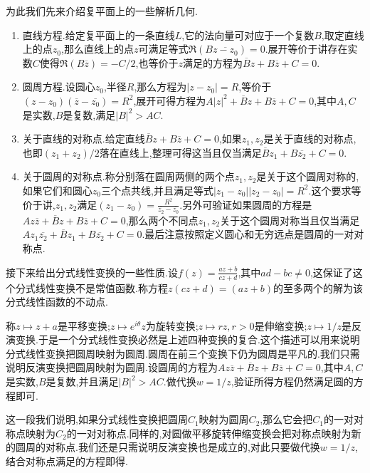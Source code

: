 为此我们先来介绍复平面上的一些解析几何.
\begin{enumerate}
	\item 直线方程.给定复平面上的一条直线$L$,它的法向量可对应于一个复数$B$,取定直线上的点$z_0$,那么直线上的点$z$可满足等式$\Re(B\overline{z-z_0})=0$.展开等价于讲存在实数$C$使得$\Re(B\overline{z})=-C/2$,也等价于$z$满足的方程为$\overline{B}z+B\overline{z}+C=0$.
	\item 圆周方程.设圆心$z_0$,半径$R$,那么方程为$|z-z_0|=R$,等价于$(z-z_0)(\overline{z}-\overline{z_0})=R^2$,展开可得方程为$A|z|^2+\overline{B}z+B\overline{z}+C=0$,其中$A,C$是实数,$B$是复数,满足$|B|^2>AC$.
	\item 关于直线的对称点.给定直线$\overline{B}z+B\overline{z}+C=0$,如果$z_1,z_2$是关于直线的对称点,也即$(z_1+z_2)/2$落在直线上,整理可得这当且仅当满足$\overline{B}z_1+B\overline{z_2}+C=0$.
	\item 关于圆周的对称点.称分别落在圆周两侧的两个点$z_1,z_2$是关于这个圆周对称的,如果它们和圆心$z_0$三个点共线,并且满足等式$|z_1-z_0||z_2-z_0|=R^2$.这个要求等价于讲,$z_1,z_2$满足$(z_1-z_0)=\frac{R^2}{\overline{z_2}-\overline{z_0}}$.另外可验证如果圆周的方程是$Az\overline{z}+\overline{B}z+B\overline{z}+C=0$,那么两个不同点$z_1,z_2$关于这个圆周对称当且仅当满足$Az_1\overline{z_2}+\overline{B}z_1+B\overline{z_2}+C=0$.最后注意按照定义圆心和无穷远点是圆周的一对对称点.
\end{enumerate}

接下来给出分式线性变换的一些性质.设$f(z)=\frac{az+b}{cz+d}$,其中$ad-bc\not=0$,这保证了这个分式线性变换不是常值函数.称方程$z(cz+d)=(az+b)$的至多两个的解为该分式线性函数的不动点.

称$z\mapsto z+a$是平移变换;$z\mapsto e^{i\theta}z$为旋转变换;$z\mapsto rz,r>0$是伸缩变换;$z\mapsto 1/z$是反演变换.于是一个分式线性变换必然是上述四种变换的复合.这个描述可以用来说明分式线性变换把圆周映射为圆周.圆周在前三个变换下仍为圆周是平凡的.我们只需说明反演变换把圆周映射为圆周.设圆周的方程为$Az\overline{z}+\overline{B}z+B\overline{z}+C=0$,其中$A,C$是实数,$B$是复数,并且满足$|B|^2>AC$.做代换$w=1/z$,验证所得方程仍然满足圆的方程即可.

这一段我们说明,如果分式线性变换把圆周$C_1$映射为圆周$C_2$,那么它会把$C_1$的一对对称点映射为$C_2$的一对对称点.同样的,对圆做平移旋转伸缩变换会把对称点映射为新的圆周的对称点.我们还是只需说明反演变换也是成立的,对此只要做代换$w=1/z$,结合对称点满足的方程即得.

















